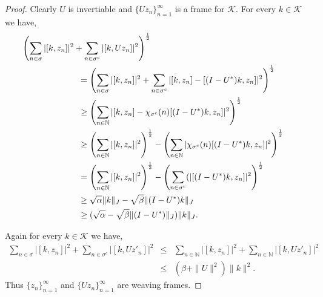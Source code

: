 \documentclass[article,12pt]{amsart}
\begin{document}
 \begin{proof}
 Clearly $U$ is invertiable and $\{Uz_n\}_{n=1}^\infty$ is a frame for $\mathcal K$.
 For every $k \in \mathcal K$ we have,      
 \begin{align*}
 \left(\sum\limits_{n \in \sigma} |[k, z_n]|^2 + \sum\limits_{n \in \sigma^c} |[k, Uz_n]|^2 \right)^\frac{1}{2} \\
 &\hspace*{-3cm} = \left(\sum\limits_{n\in\sigma} |[k, z_n]|^2 + \sum\limits_{n \in \sigma^c} |[k, z_n] - [(I - U^*)k, z_n]|^2 \right)^\frac{1}{2}\\
 & \hspace*{-3cm} \geq  \left(\sum\limits_{n \in \mathbb{N}} |[k, z_n] - \chi_{\sigma^c}(n)[(I - U^*)k, z_n]|^2 \right)^\frac{1}{2}\\
  & \hspace*{-3cm} \geq \left (\sum\limits_{n \in \mathbb{N}} |[k, z_n]|^2\right)^\frac{1}{2} - \left(\sum\limits_{n \in \mathbb{N}}|\chi_{\sigma^c}(n)[(I - U^*)k, z_n]|^2 \right)^\frac{1}{2}\\
  & \hspace*{-3cm} = \left (\sum\limits_{n \in \mathbb{N}} |[k, z_n]|^2\right)^\frac{1}{2} - \left(\sum\limits_{n \in \sigma^c}(|[(I - U^*)k, z_n]|^2 \right)^\frac{1}{2}\\
  & \hspace*{-3cm} \geq \sqrt{\alpha} \|k\|_{J} - \sqrt{\beta} \|(I - U^*)k\|_{J}\\
  & \hspace*{-3cm} \geq  (\sqrt{\alpha} - \sqrt{\beta} \|(I - U^*)\|_{J})\|k\|_{J}.
 \end{align*}
 

 

Again for every $k \in \mathcal K$ we have, 
 \begin{eqnarray*}
 \sum\limits_{n \in \sigma} |[k, z_n]|^2 + \sum\limits_{n \in \sigma^c} |[k, Uz'_n]|^2 
 &\leq&  \sum\limits_{n \in \mathbb{N} } |[k, z_n]|^2 + \sum\limits_{n \in \mathbb{N}} |[k, Uz'_n]|^2
 \\ &\leq& ( \beta + \|U\|^2) \|k\|^2.
 \end{eqnarray*} 
Thus $\{z_n\}_{n=1}^\infty$ and $\{Uz_n\}_{n=1}^\infty$ are weaving frames.
\end{proof}
\end{document}
